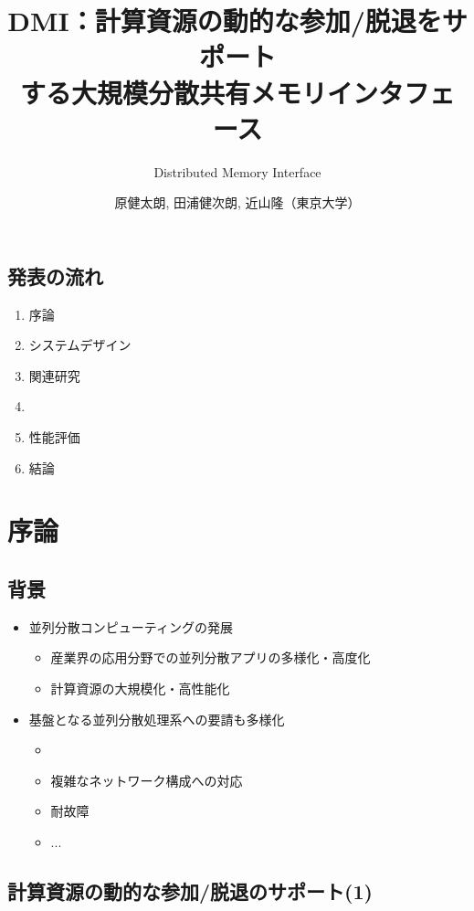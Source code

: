 \documentclass[25pt,landscape,papersize]{jsarticle}
\title{\Large DMI：計算資源の動的な参加/脱退をサポート\\
  する大規模分散共有メモリインタフェース}
\subtitle{Distributed Memory Interface}
\author{原健太朗, 田浦健次朗, 近山隆（東京大学）}
\date{\mytoday}
\begin{document}
\maketitle

\subsection{発表の流れ}

\begin{enumerate}
\item 序論
\item システムデザイン
\item 関連研究
\item {}
\item 性能評価
\item 結論
\end{enumerate}

\section{序論}

\subsection{背景}

\begin{itemize}
\item 並列分散コンピューティングの発展
  \begin{itemize}
  \item 産業界の応用分野での並列分散アプリの多様化・高度化
  \item 計算資源の大規模化・高性能化
  \end{itemize}
\item 基盤となる並列分散処理系への要請も多様化
  \begin{itemize}
  \item {}
  \item 複雑なネットワーク構成への対応
  \item 耐故障
  \item ...
  \end{itemize}
\end{itemize}

\subsection{計算資源の動的な参加/脱退のサポート(1)}
\end{document}
